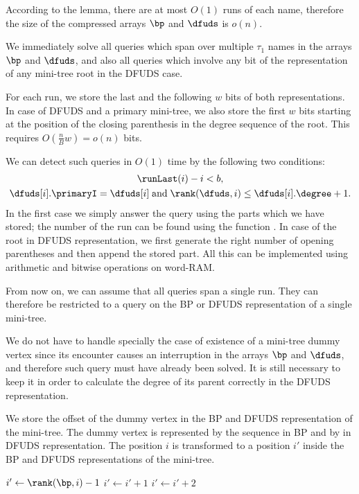 According to the lemma, there are at most $O(1)$ runs of each name, therefore the size of the compressed arrays $\bp$ and $\dfuds$ is $o(n)$.

\bigbreak

We immediately solve all queries which span over multiple $\tau_1$ names in the arrays $\bp$ and $\dfuds$, and also all queries which involve any bit of the representation of any mini-tree root in the DFUDS case.

For each run, we store the last and the following $w$ bits of both representations.
In case of DFUDS and a primary mini-tree, we also store the first $w$ bits starting at the position of the closing parenthesis in the degree sequence of the root.
This requires $O\left(\frac{n}{B} w\right) = o(n)$ bits.

We can detect such queries in $O(1)$ time by the following two conditions:
\begin{gather*}
	\runLast(i) - i < b, \\
	\dfuds[i].\primaryI = \dfuds[i] \booland \rank(\dfuds, i) \le \dfuds[i].\degree + 1.
\end{gather*}
In the first case we simply answer the query using the parts which we have stored; the number of the run can be found using the function \elementIndex{}.
In case of the root in DFUDS representation, we first generate the right number of opening parentheses and then append the stored part.
All this can be implemented using arithmetic and bitwise operations on word-RAM.

From now on, we can assume that all queries span a single run.
They can therefore be restricted to a query on the BP or DFUDS representation of a single mini-tree.

We do not have to handle specially the case of existence of a mini-tree dummy vertex since its encounter causes an interruption in the arrays $\bp$ and $\dfuds$, and therefore such query must have already been solved.
It is still necessary to keep it in order to calculate the degree of its parent correctly in the DFUDS representation.

We store the offset of the dummy vertex in the BP and DFUDS representation of the mini-tree.
The dummy vertex is represented by the sequence \str{()} in BP and by \str{)} in DFUDS representation.
The position $i$ is transformed to a position $i'$ inside the BP and DFUDS representations of the mini-tree.

\begin{algorithm}
\begin{algorithmic}
	\State $i' \gets \rank(\bp, i) - 1$
	 
		\State $i' \gets i' + 1$ 
	\EndIf
	 
		\State $i' \gets i' + 2$ 
	\EndIf
\EndFunction
\end{algorithmic}
\end{algorithm}

